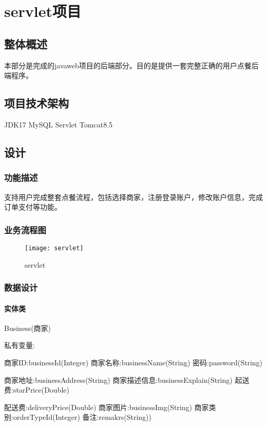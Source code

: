 \chapter{servlet项目}

\section{整体概述}
本部分是完成的javaweb项目的后端部分。目的是提供一套完整正确的用户点餐后端程序。

\section{项目技术架构}
JDK17 MySQL Servlet Tomcat8.5

\section{设计}
\subsection{功能描述}
支持用户完成整套点餐流程，包括选择商家，注册登录账户，修改账户信息，完成订单支付等功能。

\subsection{业务流程图}

\begin{figure}[htbp]
	\centering
	\texttt{[image: servlet]}
	\caption{servlet}
	\vspace{\baselineskip}
\end{figure}

\subsection{数据设计}
\subsubsection{实体类}

Business(商家)

私有变量: 

商家ID:businessId(Integer)  商家名称:businessName(String)  密码:password(String)  

商家地址:businessAddress(String)  商家描述信息:businessExplain(String)  起送费:starPrice(Double)  

配送费:deliveryPrice(Double)  商家图片:businessImg(String)  商家类别:orderTypeId(Integer)  备注:remakrs(String))



